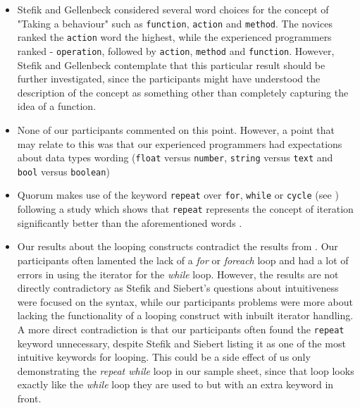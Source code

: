 \documentclass[10pt]{sigplanconf}
\begin{document}
\begin{itemize}
\item Stefik and Gellenbeck considered several word choices for the concept of "Taking a behaviour" such as \lstinline!function!, \lstinline!action! and \lstinline!method!. The novices ranked the \lstinline!action! word the highest, while the experienced programmers ranked - \lstinline!operation!, followed by \lstinline!action!, \lstinline!method! and \lstinline!function!. However, Stefik and Gellenbeck contemplate that this particular result should be further investigated, since the participants might have understood the description of the concept as something other than completely capturing the idea of a function.

\item None of our participants commented on this point. However, a point that may relate to this was that our experienced programmers had expectations about data types wording (\lstinline!float! versus \lstinline!number!, \lstinline!string! versus \lstinline!text! and \lstinline!bool! versus \lstinline!boolean!)

\item Quorum makes use of the keyword \lstinline!repeat! over \lstinline!for!, \lstinline!while! or \lstinline!cycle! (see %
\cite{SanchezData}) following a study which shows that \lstinline!repeat! represents the concept of iteration significantly better than the aforementioned words \cite{EmpStudiesonStimuli}.

\item Our results about the looping constructs contradict the results from \cite{Empiricalinvestigation}. Our participants often lamented the lack of a \textit{for} or \textit{foreach} loop and had a lot of errors in using the iterator for the \textit{while} loop. %
However, the results are not directly contradictory as Stefik and Siebert's questions about intuitiveness were focused on the syntax, while our participants problems were more about lacking the functionality of a looping construct with inbuilt iterator handling. A more direct contradiction is that our participants often found the \lstinline!repeat! keyword unnecessary, despite Stefik and Siebert listing it as one of the most intuitive keywords for looping. This could be a side effect of us only demonstrating the \textit{repeat while} loop in our sample sheet, since that loop looks exactly like the \textit{while} loop they are used to but with an extra keyword in front. 
\end{itemize}
\end{document}

